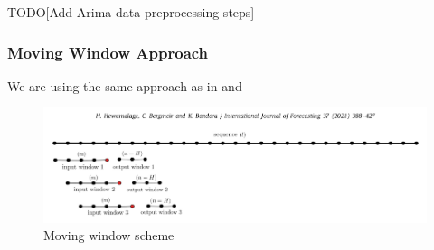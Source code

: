 TODO[Add Arima data preprocessing steps]

\subsubsection{Moving Window Approach}
We are using the same approach  as in \cite{Bandara2019} %
and \cite{Hewamalage2021}%
\begin{figure}[h!]
  \centering
  \includegraphics[width=\textwidth]{./figs/illustrations/moving_window_illustration.png}
  \hfill
  \caption{Moving window scheme \citep{Hewamalage2021}}
  \label{fig:dataset:moving_window_scheme}
\end{figure}
